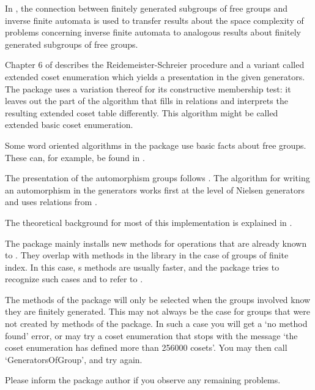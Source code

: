 In \cite{BirgetEtAl00}, the connection between finitely generated
subgroups of free groups and inverse finite automata is used to transfer
results about the space complexity of problems concerning inverse finite
automata to analogous results about finitely generated subgroups of free
groups.

Chapter 6 of \cite{Sims94} describes the Reidemeister-Schreier
procedure and a variant called extended coset enumeration which yields
a presentation in the given generators.  The {\FGA} package uses a
variation thereof for its constructive membership test: it leaves out the
part of the algorithm that fills in relations and interprets the
resulting extended coset table differently.
This algorithm might be called extended basic coset enumeration.

Some word oriented algorithms in the {\FGA} package use basic facts about
free groups.  These can, for example, be found in \cite{LyndonSchupp77}.

The presentation of the automorphism groups follows \cite{Neumann33}.
The algorithm for writing an automorphism in the generators works
first at the level of Nielsen generators and uses relations from
\cite{Nielsen}.

The theoretical background for most of this implementation is
explained in \cite{Sievers03}.


The {\FGA} package mainly installs new methods for operations that are
already known to {\GAP}.  They overlap with methods in the {\GAP}
library in the case of groups of finite index.  In this case, {\GAP}s
methods are usually faster, and the {\FGA} package tries to recognize
such cases and to refer to {\GAP}.

The methods of the {\FGA} package will only be selected when the groups
involved know they are finitely generated.  This may not always be the
case for groups that were not created by methods of the {\FGA}
package.  In such a case you will get a `no method found' error, or
{\GAP} may try a coset enumeration that stops with the message
`the coset enumeration has defined more than 256000 cosets'.
You may then call `GeneratorsOfGroup', and try again.

Please inform the package author if you observe any remaining problems.


